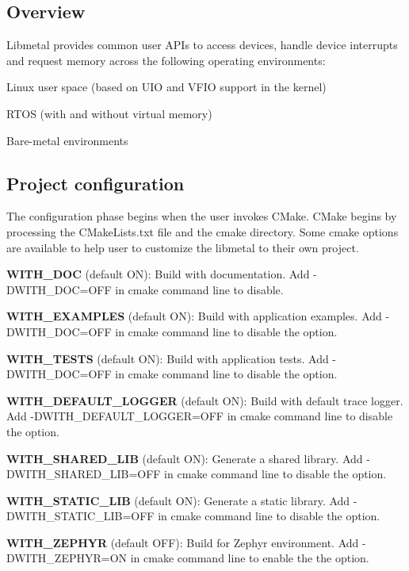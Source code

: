 \subsection*{Overview}

Libmetal provides common user A\+P\+Is to access devices, handle device interrupts and request memory across the following operating environments\+:
\begin{DoxyItemize}
\item Linux user space (based on U\+IO and V\+F\+IO support in the kernel)
\item R\+T\+OS (with and without virtual memory)
\item Bare-\/metal environments
\end{DoxyItemize}

\subsection*{Project configuration}

The configuration phase begins when the user invokes C\+Make. C\+Make begins by processing the C\+Make\+Lists.\+txt file and the cmake directory. Some cmake options are available to help user to customize the libmetal to their own project.


\begin{DoxyItemize}
\item {\bfseries W\+I\+T\+H\+\_\+\+D\+OC} (default ON)\+: Build with documentation. Add -\/\+D\+W\+I\+T\+H\+\_\+\+D\+OC=O\+FF in cmake command line to disable.
\item {\bfseries W\+I\+T\+H\+\_\+\+E\+X\+A\+M\+P\+L\+ES} (default ON)\+: Build with application examples. Add -\/\+D\+W\+I\+T\+H\+\_\+\+D\+OC=O\+FF in cmake command line to disable the option.
\item {\bfseries W\+I\+T\+H\+\_\+\+T\+E\+S\+TS} (default ON)\+: Build with application tests. Add -\/\+D\+W\+I\+T\+H\+\_\+\+D\+OC=O\+FF in cmake command line to disable the option.
\item {\bfseries W\+I\+T\+H\+\_\+\+D\+E\+F\+A\+U\+L\+T\+\_\+\+L\+O\+G\+G\+ER} (default ON)\+: Build with default trace logger. Add -\/\+D\+W\+I\+T\+H\+\_\+\+D\+E\+F\+A\+U\+L\+T\+\_\+\+L\+O\+G\+G\+ER=O\+FF in cmake command line to disable the option.
\item {\bfseries W\+I\+T\+H\+\_\+\+S\+H\+A\+R\+E\+D\+\_\+\+L\+IB} (default ON)\+: Generate a shared library. Add -\/\+D\+W\+I\+T\+H\+\_\+\+S\+H\+A\+R\+E\+D\+\_\+\+L\+IB=O\+FF in cmake command line to disable the option.
\item {\bfseries W\+I\+T\+H\+\_\+\+S\+T\+A\+T\+I\+C\+\_\+\+L\+IB} (default ON)\+: Generate a static library. Add -\/\+D\+W\+I\+T\+H\+\_\+\+S\+T\+A\+T\+I\+C\+\_\+\+L\+IB=O\+FF in cmake command line to disable the option.
\item {\bfseries W\+I\+T\+H\+\_\+\+Z\+E\+P\+H\+YR} (default O\+FF)\+: Build for Zephyr environment. Add -\/\+D\+W\+I\+T\+H\+\_\+\+Z\+E\+P\+H\+YR=ON in cmake command line to enable the the option.
\end{DoxyItemize}

